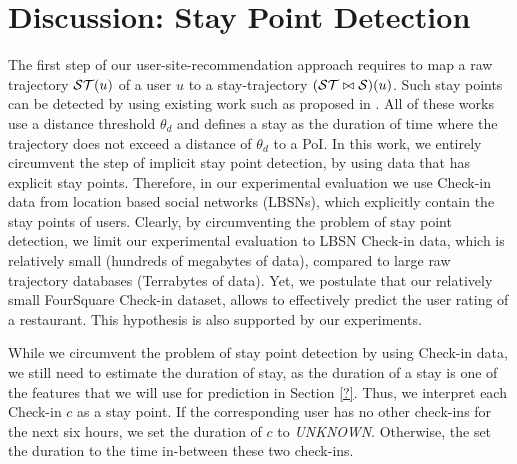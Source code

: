 \section{Discussion: Stay Point Detection}\label{sec:stay}
The first step of our user-site-recommendation approach requires to map a raw trajectory $\mathcal{ST}(u)$ of a user $u$ to a stay-trajectory $(\mathcal{ST}\bowtie\mathcal{S})(u)$. Such stay points can be detected by using existing work such as proposed in \cite{li2008mining,zheng2009mining,zheng2010geolife,xiao2010finding}. All of these works use a distance threshold $\theta_{d}$ and defines a stay as the duration of time where the trajectory does not exceed a distance of $\theta_{d}$ to a PoI. In this work, we entirely circumvent the step of implicit stay point detection, by using data that has explicit stay points. Therefore, in our experimental evaluation we use Check-in data from location based social networks (LBSNs), which explicitly contain the stay points of users. Clearly, by circumventing the problem of stay point detection, we limit our experimental evaluation to LBSN Check-in data, which is relatively small (hundreds of megabytes of data), compared to large raw trajectory databases (Terrabytes of data).
Yet, we postulate that our relatively small FourSquare Check-in dataset, allows to effectively predict the user rating of a restaurant. This hypothesis is also supported by our experiments.

While we circumvent the problem of stay point detection by using Check-in data, we still need to estimate the duration of stay, as the duration of a stay is one of the features that we will use for prediction in Section \ref{?}. Thus, we interpret each Check-in $c$ as a stay point. If the corresponding user has no other check-ins for the next six hours, we set the duration of $c$ to \emph{UNKNOWN}. Otherwise, the set the duration to the time in-between these two check-ins. 